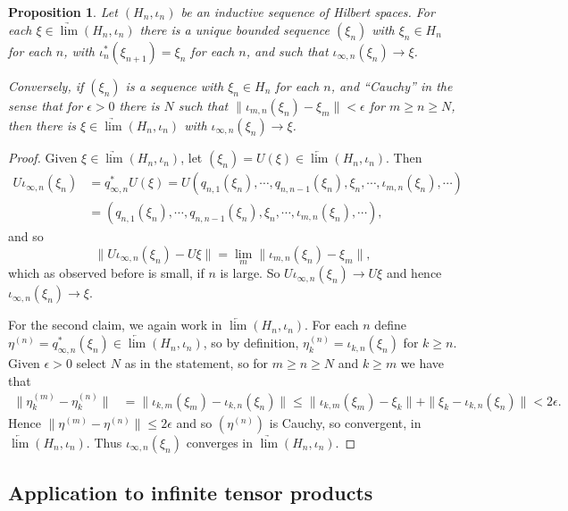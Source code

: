 \documentclass[twoside,a4paper,12pt]{article}
\theoremstyle{plain}
\newtheorem{proposition}{Proposition}[section]
\theoremstyle{definition}
\begin{document}
\begin{proposition}
Let $(H_n, \iota_n)$ be an inductive sequence of Hilbert spaces.  For each $\xi \in \underrightarrow{\lim} (H_n,\iota_n)$ there is a unique bounded sequence $(\xi_n)$ with $\xi_n\in H_n$ for each $n$, with $\iota_n^*(\xi_{n+1}) = \xi_n$ for each $n$, and such that $\iota_{\infty,n}(\xi_n) \to \xi$.

Conversely, if $(\xi_n)$ is a sequence with $\xi_n\in H_n$ for each $n$, and ``Cauchy'' in the sense that for $\epsilon>0$ there is $N$ such that $\| \iota_{m,n}(\xi_n) - \xi_m \|<\epsilon$ for $m \geq n\geq N$, then there is $\xi \in \underrightarrow{\lim} (H_n,\iota_n)$ with $\iota_{\infty,n}(\xi_n) \to \xi$.
\end{proposition}
\begin{proof}
Given $\xi \in \underrightarrow{\lim} (H_n,\iota_n)$, let $(\xi_n) = U(\xi) \in \underleftarrow{\lim} (H_n,\iota_n)$.  Then
\begin{align*}
U \iota_{\infty,n}(\xi_n)
&= q_{\infty,n}^* U(\xi)
= U(q_{n,1}(\xi_n),\cdots,q_{n,n-1}(\xi_n),\xi_n, \cdots, \iota_{m,n}(\xi_n), \cdots) \\
&= (q_{n,1}(\xi_n),\cdots,q_{n,n-1}(\xi_n),\xi_n, \cdots, \iota_{m,n}(\xi_n), \cdots),
\end{align*}
and so
\[ \| U \iota_{\infty,n}(\xi_n) - U\xi\|
= \lim_m \| \iota_{m,n}(\xi_n) - \xi_m \|, \]
which as observed before is small, if $n$ is large.  So $U \iota_{\infty,n}(\xi_n) \to U\xi$ and hence $\iota_{\infty,n}(\xi_n) \to \xi$.

For the second claim, we again work in $\underleftarrow{\lim} (H_n,\iota_n)$.  For each $n$ define $\eta^{(n)} = q_{\infty,n}^*(\xi_n) \in \underleftarrow{\lim} (H_n,\iota_n)$, so by definition, $\eta^{(n)}_k = \iota_{k,n}(\xi_n)$ for $k\geq n$.
Given $\epsilon>0$ select $N$ as in the statement, so for $m\geq n\geq N$ and $k\geq m$ we have that
\begin{align*}
\| \eta^{(m)}_k - \eta^{(n)}_k \|
&= \| \iota_{k,m}(\xi_m) - \iota_{k,n}(\xi_n) \|
\leq \| \iota_{k,m}(\xi_m) - \xi_k \| + \| \xi_k - \iota_{k,n}(\xi_n) \| < 2\epsilon.
\end{align*}
Hence $\| \eta^{(m)} - \eta^{(n)}\| \leq 2\epsilon$ and so $(\eta^{(n)})$ is Cauchy, so convergent, in $\underleftarrow{\lim} (H_n,\iota_n)$.  Thus $\iota_{\infty,n}(\xi_n)$ converges in $\underrightarrow{\lim} (H_n,\iota_n)$.
\end{proof}


\subsection{Application to infinite tensor products}
\end{document}
